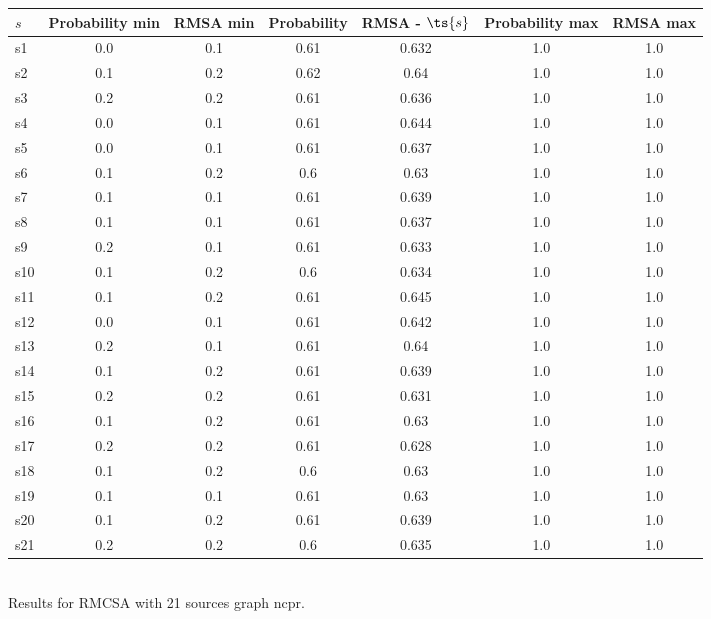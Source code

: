 \documentclass{article}
\begin{document}
\noindent\begin{tabular}{|l|c|c|c|c|c|c|}
\hline
$s$& Probability min & RMSA min & Probability & RMSA - $\ts{s}$ & Probability max & RMSA max\\
\hline
s1 &0.0 & 0.1 & 0.61 & 0.632 & 1.0 & 1.0\\
\hline
s2 &0.1 & 0.2 & 0.62 & 0.64 & 1.0 & 1.0\\
\hline
s3 &0.2 & 0.2 & 0.61 & 0.636 & 1.0 & 1.0\\
\hline
s4 &0.0 & 0.1 & 0.61 & 0.644 & 1.0 & 1.0\\
\hline
s5 &0.0 & 0.1 & 0.61 & 0.637 & 1.0 & 1.0\\
\hline
s6 &0.1 & 0.2 & 0.6 & 0.63 & 1.0 & 1.0\\
\hline
s7 &0.1 & 0.1 & 0.61 & 0.639 & 1.0 & 1.0\\
\hline
s8 &0.1 & 0.1 & 0.61 & 0.637 & 1.0 & 1.0\\
\hline
s9 &0.2 & 0.1 & 0.61 & 0.633 & 1.0 & 1.0\\
\hline
s10 &0.1 & 0.2 & 0.6 & 0.634 & 1.0 & 1.0\\
\hline
s11 &0.1 & 0.2 & 0.61 & 0.645 & 1.0 & 1.0\\
\hline
s12 &0.0 & 0.1 & 0.61 & 0.642 & 1.0 & 1.0\\
\hline
s13 &0.2 & 0.1 & 0.61 & 0.64 & 1.0 & 1.0\\
\hline
s14 &0.1 & 0.2 & 0.61 & 0.639 & 1.0 & 1.0\\
\hline
s15 &0.2 & 0.2 & 0.61 & 0.631 & 1.0 & 1.0\\
\hline
s16 &0.1 & 0.2 & 0.61 & 0.63 & 1.0 & 1.0\\
\hline
s17 &0.2 & 0.2 & 0.61 & 0.628 & 1.0 & 1.0\\
\hline
s18 &0.1 & 0.2 & 0.6 & 0.63 & 1.0 & 1.0\\
\hline
s19 &0.1 & 0.1 & 0.61 & 0.63 & 1.0 & 1.0\\
\hline
s20 &0.1 & 0.2 & 0.61 & 0.639 & 1.0 & 1.0\\
\hline
s21 &0.2 & 0.2 & 0.6 & 0.635 & 1.0 & 1.0\\
\hline
\end{tabular}\\

\noindent Results for RMCSA with 21 sources graph ncpr.
\end{document}

